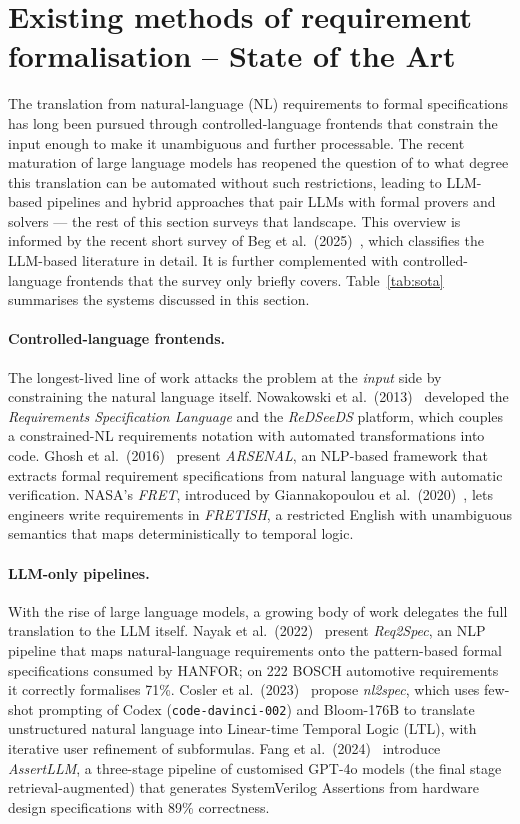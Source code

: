 \section{Existing methods of requirement formalisation -- State of the Art}\label{sec:sota}

The translation from natural-language (NL) requirements to formal specifications has long been pursued through controlled-language frontends that constrain the input enough to make it unambiguous and further processable. The recent maturation of large language models has reopened the question of to what degree this translation can be automated without such restrictions, leading to LLM-based pipelines and hybrid approaches that pair LLMs with formal provers and solvers --- the rest of this section surveys that landscape.
This overview is informed by the recent short survey of Beg et al.\ (2025)~\cite{beg2025survey}, which classifies the LLM-based literature in detail. It is further complemented with controlled-language frontends that the survey only briefly covers.
Table~\ref{tab:sota} summarises the systems discussed in this section.

\paragraph{Controlled-language frontends.}
The longest-lived line of work attacks the problem at the \emph{input} side by constraining the natural language itself.
Nowakowski et al.\ (2013)~\cite{nowakowski2013requirements} developed the \emph{Requirements Specification Language} and the \emph{ReDSeeDS} platform, which couples a constrained-NL requirements notation with automated transformations into code.
Ghosh et al.\ (2016)~\cite{Ghosh2016} present \emph{ARSENAL}, an NLP-based framework that extracts formal requirement specifications from natural language with automatic verification.
NASA's \emph{FRET}, introduced by Giannakopoulou et al.\ (2020)~\cite{giannakopoulou2020fret}, lets engineers write requirements in \emph{FRETISH}, a restricted English with unambiguous semantics that maps deterministically to temporal logic.

\paragraph{LLM-only pipelines.}
With the rise of large language models, a growing body of work delegates the full translation to the LLM itself.
Nayak et al.\ (2022)~\cite{Req2SpecPaper} present \emph{Req2Spec}, an NLP pipeline that maps natural-language requirements onto the pattern-based formal specifications consumed by HANFOR; on 222 BOSCH automotive requirements it correctly formalises 71\%.
Cosler et al.\ (2023)~\cite{cosler2023nl2specinteractivelytranslatingunstructured} propose \emph{nl2spec}, which uses few-shot prompting of Codex (\texttt{code-davinci-002}) and Bloom-176B to translate unstructured natural language into Linear-time Temporal Logic (LTL), with iterative user refinement of subformulas.
Fang et al.\ (2024)~\cite{10691792} introduce \emph{AssertLLM}, a three-stage pipeline of customised GPT-4o models (the final stage retrieval-augmented) that generates SystemVerilog Assertions from hardware design specifications with 89\% correctness.

